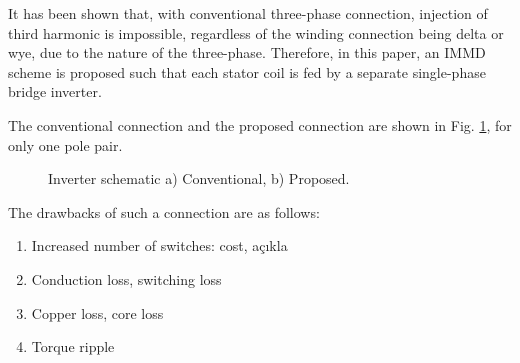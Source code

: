 \documentclass[conference,a4paper,twocolumn]{IEEEtran}
\begin{document}
It has been shown that, with conventional three-phase connection, injection of third harmonic is impossible, regardless of the winding connection being delta or wye, due to the nature of the three-phase. Therefore, in this paper, an IMMD scheme is proposed such that each stator coil is fed by a separate single-phase bridge inverter.

The conventional connection and the proposed connection are shown in Fig. \ref{fig:conv_conn}, for only one pole pair.


\begin{figure}[] 
\centering
{} \hfil 
{}
\caption{Inverter schematic a) Conventional, b) Proposed.} 
\label{fig:conv_conn} 
\end{figure}

The drawbacks of such a connection are as follows: 
\begin{enumerate}
  \item Increased number of switches: cost, açıkla
  \item Conduction loss, switching loss
  \item Copper loss, core loss
  \item Torque ripple
\end{enumerate}
\end{document}
